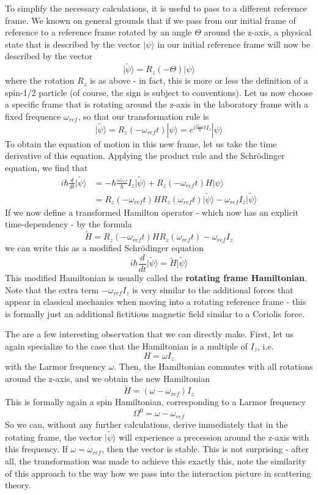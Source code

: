 \documentclass[a4paper, draft]{article}
\theoremstyle{own}
\theoremstyle{remark}
\begin{document}
To simplify the necessary calculations, it is useful to pass to a different reference frame. We known on general grounds that if we pass from our initial frame of reference to a reference frame rotated by an angle $\Theta$ around the z-axis, a physical state that is described by the vector $|\psi \rangle$ in our initial reference frame will now be described by the vector
$$
\widetilde{|\psi\rangle} = R_z(-\Theta) |\psi \rangle
$$ 
where the rotation $R_z$ is as above - in fact, this is more or less the definition of a spin-1/2 particle (of course, the sign is subject to conventions). Let us now choose a specific frame that is rotating around the z-axis in the laboratory frame with a fixed frequence $\omega_{ref}$, so that our transformation rule is
$$
\widetilde{|\psi\rangle} = R_z(-\omega_{ref} t) |\psi \rangle = e^{i\frac{\omega_{ref}}{\hbar}t I_z} |\psi \rangle
$$ 
To obtain the equation of motion in this new frame, let us take the time derivative of this equation. Applying the product rule and the Schr\"odinger equation, we find that
\begin{align*}
i \hbar \frac{d}{dt} \widetilde{|\psi\rangle} &= 
-\hbar \frac{\omega_{ref}}{\hbar} I_z \widetilde{|\psi\rangle} + 
R_z(-\omega_{ref} t) H |\psi \rangle \\
&= R_z(-\omega_{ref}t ) H R_z(\omega_{ref}t ) \widetilde{|\psi\rangle} - \omega_{ref}  I_z  \widetilde{|\psi\rangle}
\end{align*}
If we now define a transformed Hamilton operator - which now has an explicit time-dependency - by the formula
$$
\widetilde{H} = R_z(-\omega_{ref}t ) H R_z(\omega_{ref}t ) - \omega_{ref}  I_z
$$
we can write this as a modified Schr\"odinger equation
$$
i \hbar \frac{d}{dt} \widetilde{|\psi\rangle} = \widetilde{H} \widetilde{|\psi\rangle}
$$
This modified Hamiltonian is usually called the {\bf rotating frame Hamiltonian}. Note that the extra term $ - \omega_{ref}  I_z$ is very similar to the additional forces that appear in classical mechanics when moving into a rotating reference frame - this is formally just an additional fictitious magnetic field similar to a Coriolis force. 

The are a few interesting observation that we can directly make. First, let us again specialize to the case that the Hamiltonian is a multiple of $I_z$, i.e. 
$$
H = \omega I_z
$$
with the Larmor frequency $\omega$. Then, the Hamiltonian commutes with all rotations around the z-axis, and we obtain the new Hamiltonian
$$
\widetilde{H} = (\omega - \omega_{ref}) I_z
$$
This is formally again a spin Hamiltonian, corresponding to a Larmor frequency 
$$
\Omega^0 = \omega - \omega_{ref}
$$
So we can, without any further calculations, derive immediately that in the rotating frame, the vector $\widetilde{|\psi\rangle}$ will experience a precession around the z-axis with this frequency. If $\omega = \omega_{ref}$, then the vector is stable. This is not surprising - after all, the transformation was made to achieve this exactly this, note the similarity of this approach to the way how we pass into the interaction picture in scattering theory. 
\end{document}
